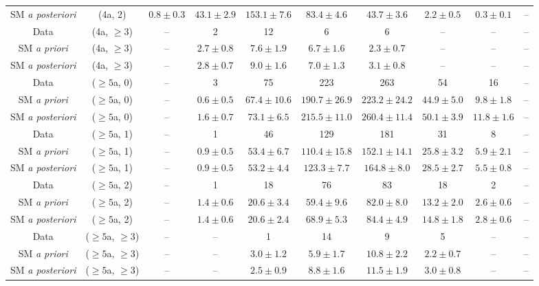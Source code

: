 \begin{table}[h!]
{\begin{tabular}{cccccccccc}
	SM \textit{a posteriori} & (4a, 2) & $0.8\pm 0.3$ & $43.1\pm 2.9$ & $153.1\pm 7.6$ & $83.4\pm 4.6$ & $43.7\pm 3.6$ & $2.2\pm 0.5$ & $0.3\pm 0.1$ & -- \\[0.5ex] 
	Data & (4a, $\ge3$) & -- & 2 & 12 & 6 & 6 & -- & -- & -- \\[0.5ex] 
	SM \textit{a priori} & (4a, $\ge3$) & -- & $2.7\pm 0.8$ & $7.6\pm 1.9$ & $6.7\pm 1.6$ & $2.3\pm 0.7$ & -- & -- & -- \\[0.5ex] 
	SM \textit{a posteriori} & (4a, $\ge3$) & -- & $2.8\pm 0.7$ & $9.0\pm 1.6$ & $7.0\pm 1.3$ & $3.1\pm 0.8$ & -- & -- & -- \\[0.5ex] 
	Data & ($\ge5$a, 0) & -- & 3 & 75 & 223 & 263 & 54 & 16 & -- \\[0.5ex] 
	SM \textit{a priori} & ($\ge5$a, 0) & -- & $0.6\pm 0.5$ & $67.4\pm 10.6$ & $190.7\pm 26.9$ & $223.2\pm 24.2$ & $44.9\pm 5.0$ & $9.8\pm 1.8$ & -- \\[0.5ex] 
	SM \textit{a posteriori} & ($\ge5$a, 0) & -- & $1.6\pm 0.7$ & $73.1\pm 6.5$ & $215.5\pm 11.0$ & $260.4\pm 11.4$ & $50.1\pm 3.9$ & $11.8\pm 1.6$ & -- \\[0.5ex] 
	Data & ($\ge5$a, 1) & -- & 1 & 46 & 129 & 181 & 31 & 8 & -- \\[0.5ex] 
	SM \textit{a priori} & ($\ge5$a, 1) & -- & $0.9\pm 0.5$ & $53.4\pm 6.7$ & $110.4\pm 15.8$ & $152.1\pm 14.1$ & $25.8\pm 3.2$ & $5.9\pm 2.1$ & -- \\[0.5ex] 
	SM \textit{a posteriori} & ($\ge5$a, 1) & -- & $0.9\pm 0.5$ & $53.2\pm 4.4$ & $123.3\pm 7.7$ & $164.8\pm 8.0$ & $28.5\pm 2.7$ & $5.5\pm 0.8$ & -- \\[0.5ex] 
	Data & ($\ge5$a, 2) & -- & 1 & 18 & 76 & 83 & 18 & 2 & -- \\[0.5ex] 
	SM \textit{a priori} & ($\ge5$a, 2) & -- & $1.4\pm 0.6$ & $20.6\pm 3.4$ & $59.4\pm 9.6$ & $82.0\pm 8.0$ & $13.2\pm 2.0$ & $2.6\pm 0.6$ & -- \\[0.5ex] 
	SM \textit{a posteriori} & ($\ge5$a, 2) & -- & $1.4\pm 0.6$ & $20.6\pm 2.4$ & $68.9\pm 5.3$ & $84.4\pm 4.9$ & $14.8\pm 1.8$ & $2.8\pm 0.6$ & -- \\[0.5ex] 
	Data & ($\ge5$a, $\ge3$) & -- & -- & 1 & 14 & 9 & 5 & -- & -- \\[0.5ex] 
	SM \textit{a priori} & ($\ge5$a, $\ge3$) & -- & -- & $3.0\pm 1.2$ & $5.9\pm 1.7$ & $10.8\pm 2.2$ & $2.2\pm 0.7$ & -- & -- \\[0.5ex] 
	SM \textit{a posteriori} & ($\ge5$a, $\ge3$) & -- & -- & $2.5\pm 0.9$ & $8.8\pm 1.6$ & $11.5\pm 1.9$ & $3.0\pm 0.8$ & -- & -- \\[0.5ex] 
	\hline
	\hline
\end{tabular}}
\end{table}
